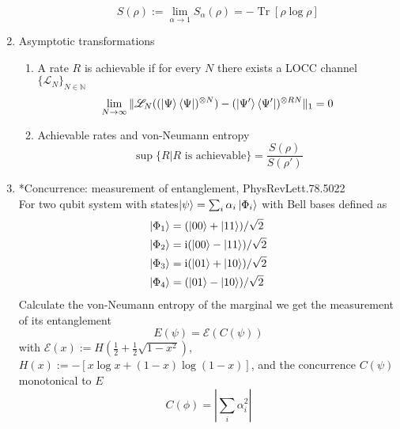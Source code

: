 \documentclass[11pt,a4paper]{article}%
\numberwithin{equation}{section}
\newcommand\mi{\mathrm{i}}
\newcommand{\Tr}{\operatorname{Tr}}
\begin{document}
\begin{enumerate}
\begin{enumerate}
\begin{equation}
            S(\rho):=\lim_{\alpha\to 1}S_\alpha(\rho) = -\Tr[\rho\log\rho]
        \end{equation}
    \end{enumerate}
    \item Asymptotic transformations
    \begin{enumerate}
        \item A rate $R$ is achievable if for every $N$ there exists a LOCC channel $\{\mathscr L_N\}_{N\in\mathbb N}$
        \begin{equation}
            \lim_{N\to\infty}\Vert\mathscr L_N((\ket\Psi\bra\Psi)^{\otimes N})-(\ket{\Psi'}\bra{\Psi'})^{\otimes RN}\Vert_1 = 0
        \end{equation}
        \item Achievable rates and von-Neumann entropy
        \begin{equation}
            \sup\{R|R\mbox{ is achievable}\} = \frac{S(\rho)}{S(\rho')}
        \end{equation}
    \end{enumerate}
    \item *Concurrence: measurement of entanglement, PhysRevLett.78.5022 \\
    For two qubit system with states$\ket\psi = \sum_i\alpha_i\ket{\Phi_i}$ with Bell bases defined as 
    \begin{align}
        \ket{\Phi_1} &= (\ket{00}+\ket{11})/\sqrt2 \\
        \ket{\Phi_2} &= \mi(\ket{00}-\ket{11})/\sqrt2 \\
        \ket{\Phi_3} &= \mi(\ket{01}+\ket{10})/\sqrt2 \\
        \ket{\Phi_4} &= (\ket{01}-\ket{10})/\sqrt2
    \end{align}
    Calculate the von-Neumann entropy of the marginal we get the measurement of its entanglement
    \begin{equation}
        E(\psi) = \mathcal E(C(\psi))
    \end{equation}
    with $\mathcal E(x) := H(\frac 12+\frac 12\sqrt{1-x^2})$, $H(x) := -[x\log x + (1-x)\log (1-x)]$, and the concurrence $C(\psi)$ monotonical to $E$
    \begin{equation}
        C(\phi) = \left|\sum_i \alpha_i^2\right|
    \end{equation}
\end{enumerate}
\end{document}
